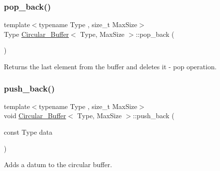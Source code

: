 \mbox{\label{classCircular__Buffer_a0b7b0fb1ecffc75ba233fed043616313}} 
\subsubsection{\texorpdfstring{pop\+\_\+back()}{pop\_back()}}
{\footnotesize\ttfamily template$<$typename Type , size\+\_\+t Max\+Size$>$ \\
Type \hyperlink{classCircular__Buffer}{Circular\+\_\+\+Buffer}$<$ Type, Max\+Size $>$\+::pop\+\_\+back (\begin{DoxyParamCaption}{ }\end{DoxyParamCaption})\hspace{0.3cm}{\ttfamily [inline]}}



Returns the last element from the buffer and deletes it -\/ pop operation. 

\mbox{\label{classCircular__Buffer_a2271c0b158052ae6491972ce7237f888}} 
\subsubsection{\texorpdfstring{push\+\_\+back()}{push\_back()}}
{\footnotesize\ttfamily template$<$typename Type , size\+\_\+t Max\+Size$>$ \\
void \hyperlink{classCircular__Buffer}{Circular\+\_\+\+Buffer}$<$ Type, Max\+Size $>$\+::push\+\_\+back (\begin{DoxyParamCaption}\item[{const Type}]{data }\end{DoxyParamCaption})\hspace{0.3cm}{\ttfamily [inline]}}



Adds a datum to the circular buffer. 

\mbox{\label{classCircular__Buffer_a902eea867fd0c933af19b91f9b97ccee}} 
